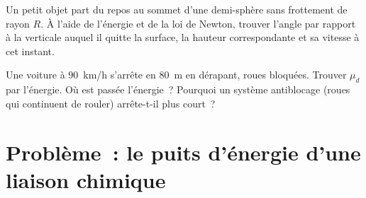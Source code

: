\begin{exercise}[$\star\star\star$]\label{exo:b1:work-and-energy:11}
Un petit objet part du repos au sommet d'une demi-sphère sans frottement
de rayon $R$. À l'aide de l'énergie et de la loi de Newton, trouver
l'angle par rapport à la verticale auquel il quitte la surface, la
hauteur correspondante et sa vitesse à cet instant.
\end{exercise}

\begin{exercise}[$\star\star\star$]\label{exo:b1:work-and-energy:12}
Une voiture à \qty{90}{km/h} s'arrête en \qty{80}{m} en dérapant, roues
bloquées. Trouver $\mu_d$ par l'énergie. Où est passée l'énergie~?
Pourquoi un système antiblocage (roues qui continuent de rouler)
arrête-t-il plus court~?
\end{exercise}

\section{Problème~: le puits d'énergie d'une liaison chimique}

